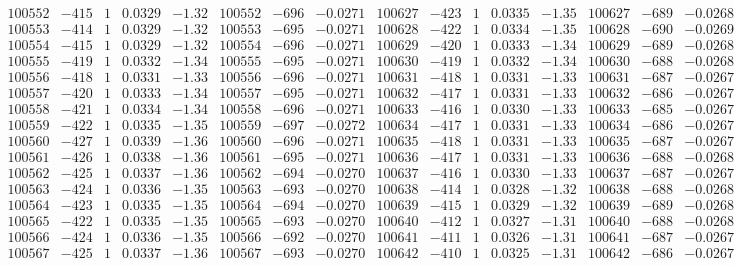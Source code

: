 \documentclass[11pt,reqno,a4letter]{article}
\numberwithin{figure}{section}
\numberwithin{table}{section}
\theoremstyle{plain}
\numberwithin{theorem}{section}
\theoremstyle{definition}
\begin{document}
\begin{table}[ht!]
\begin{equation*}
{\begin{array}{ccccc|ccc||ccccc|ccc}
100552 & -415 & 1 & 0.0329 & -1.32 & 100552 & -696 & -0.0271 & 100627 & -423 & 1 & 0.0335 & -1.35 & 100627 & -689 & -0.0268  \\
100553 & -414 & 1 & 0.0329 & -1.32 & 100553 & -695 & -0.0271 & 100628 & -422 & 1 & 0.0334 & -1.35 & 100628 & -690 & -0.0269  \\
100554 & -415 & 1 & 0.0329 & -1.32 & 100554 & -696 & -0.0271 & 100629 & -420 & 1 & 0.0333 & -1.34 & 100629 & -689 & -0.0268  \\
100555 & -419 & 1 & 0.0332 & -1.34 & 100555 & -695 & -0.0271 & 100630 & -419 & 1 & 0.0332 & -1.34 & 100630 & -688 & -0.0268  \\
100556 & -418 & 1 & 0.0331 & -1.33 & 100556 & -696 & -0.0271 & 100631 & -418 & 1 & 0.0331 & -1.33 & 100631 & -687 & -0.0267  \\
100557 & -420 & 1 & 0.0333 & -1.34 & 100557 & -695 & -0.0271 & 100632 & -417 & 1 & 0.0331 & -1.33 & 100632 & -686 & -0.0267  \\
100558 & -421 & 1 & 0.0334 & -1.34 & 100558 & -696 & -0.0271 & 100633 & -416 & 1 & 0.0330 & -1.33 & 100633 & -685 & -0.0267  \\
100559 & -422 & 1 & 0.0335 & -1.35 & 100559 & -697 & -0.0272 & 100634 & -417 & 1 & 0.0331 & -1.33 & 100634 & -686 & -0.0267  \\
100560 & -427 & 1 & 0.0339 & -1.36 & 100560 & -696 & -0.0271 & 100635 & -418 & 1 & 0.0331 & -1.33 & 100635 & -687 & -0.0267  \\
100561 & -426 & 1 & 0.0338 & -1.36 & 100561 & -695 & -0.0271 & 100636 & -417 & 1 & 0.0331 & -1.33 & 100636 & -688 & -0.0268  \\
100562 & -425 & 1 & 0.0337 & -1.36 & 100562 & -694 & -0.0270 & 100637 & -416 & 1 & 0.0330 & -1.33 & 100637 & -687 & -0.0267  \\
100563 & -424 & 1 & 0.0336 & -1.35 & 100563 & -693 & -0.0270 & 100638 & -414 & 1 & 0.0328 & -1.32 & 100638 & -688 & -0.0268  \\
100564 & -423 & 1 & 0.0335 & -1.35 & 100564 & -694 & -0.0270 & 100639 & -415 & 1 & 0.0329 & -1.32 & 100639 & -689 & -0.0268  \\
100565 & -422 & 1 & 0.0335 & -1.35 & 100565 & -693 & -0.0270 & 100640 & -412 & 1 & 0.0327 & -1.31 & 100640 & -688 & -0.0268  \\
100566 & -424 & 1 & 0.0336 & -1.35 & 100566 & -692 & -0.0270 & 100641 & -411 & 1 & 0.0326 & -1.31 & 100641 & -687 & -0.0267  \\
100567 & -425 & 1 & 0.0337 & -1.36 & 100567 & -693 & -0.0270 & 100642 & -410 & 1 & 0.0325 & -1.31 & 100642 & -686 & -0.0267  \\

\end{array}}
\end{equation*}
\end{table}
\end{document}
